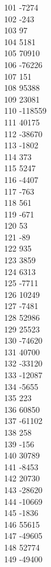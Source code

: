 { 101	-7274 \\
 102	-243 \\
 103	97 \\
 104	5181 \\
 105	70910 \\
 106	-76226 \\
 107	151 \\
 108	95388 \\
 109	23081 \\
 110	-118559 \\
 111	40175 \\
 112	-38670 \\
 113	-1802 \\
 114	373 \\
 115	5247 \\
 116	-4407 \\
 117	-763 \\
 118	561 \\
 119	-671 \\
 120	53 \\
 121	-89 \\
 122	935 \\
 123	3859 \\
 124	6313 \\
 125	-7711 \\
 126	10249 \\
 127	-7481 \\
 128	52986 \\
 129	25523 \\
 130	-74620 \\
 131	40700 \\
 132	-33120 \\
 133	-12087 \\
 134	-5655 \\
 135	223 \\
 136	60850 \\
 137	-61102 \\
 138	258 \\
 139	-156 \\
 140	30789 \\
 141	-8453 \\
 142	20730 \\
 143	-28620 \\
 144	-10669 \\
 145	-1836 \\
 146	55615 \\
 147	-49605 \\
 148	52774 \\
 149	-49400 \\
}
